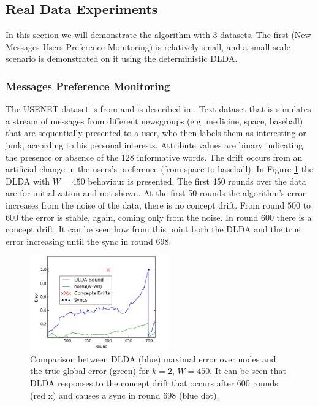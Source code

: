 \documentclass[11pt,twocolumn,varwidth=true,a4paper,fleqn]{article}
\begin{document}
\subsection{Real Data Experiments}
In this section we will demonstrate the algorithm with 3 datasets. The first
(New Messages Users Preference Monitoring) is relatively small, and a small scale
scenario is demonstrated on it using the deterministic DLDA. 
\subsubsection{Messages Preference Monitoring}
The USENET dataset is from \cite{usenetSource} and is described in
\cite{usenet}.
Text dataset that is simulates a stream of messages from different newsgroups
(e.g. medicine, space, baseball) that are sequentially presented to a user, 
who then labels them as interesting or junk, according to his personal interests. 
Attribute values are binary indicating the presence or absence of the 128
informative words. The drift occurs from an artificial change in the users's
preference (from space to baseball). In Figure \ref{usenet} the DLDA with
$W=450$ behaviour is presented. The first 450 rounds over the data are for
initialization and not shown. At the first 50 rounds the algorithm's error
increases from the noise of the data, there is no concept drift. From round 500
to 600 the error is stable, again, coming only from the noise. In round 600
there is a concept drift. It can be seen how from this point both the DLDA and
the true error increasing until the sync in round 698.

\begin{figure}[h]
	\centering
	\includegraphics[width=60mm]{Usenet/DriftDetected.png}
	\caption{Comparison between DLDA (blue) maximal error over nodes and the true
	global error (green) for $k=2$, $W=450$. It can be seen that DLDA responses to
	the concept drift that occurs after 600 rounds (red x) and causes a sync in
	round 698 (blue dot).}
	\label{usenet}
	\end{figure}
	
\end{document}
